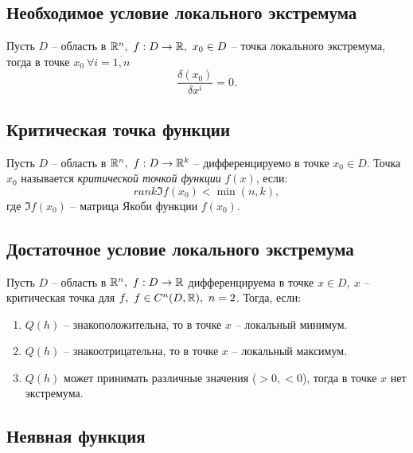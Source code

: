 \subsection{Необходимое условие локального экстремума}

\begin{theorem}
    Пусть $D$ -- область в $ \mathbb{R}^n, \ f:D \rightarrow\mathbb{R}, \ x_0 \in D $ -- точка локального экстремума, тогда в точке $ x_0 \ \forall i = \overline{1,n}$
    \[
        \frac{\delta(x_0)}{\delta x^i} = 0.
    \]
\end{theorem}

\subsection{Критическая точка функции}

\begin{definition}
    Пусть $ D $ -- область в $ \mathbb{R}^n, \ f:D \rightarrow\mathbb{R}^k $ -- дифференцируемо в точке $ x_0 \in D $. Точка $ x_0 $ называется \emph{критической точкой функции} $ f(x) $, если:
    \[
        rank \mathfrak{I} f(x_0) < \min(n,k),
    \] где $ \mathfrak{I}f(x_0) $ -- матрица Якоби функции $ f(x_0) $.
\end{definition}

\subsection{Достаточное условие локального экстремума}

\begin{theorem}
    Пусть $D$ -- область в $\mathbb{R}^n, \ f: D \rightarrow \mathbb{R}$ дифференцируема в точке $x \in D, \ x$ -- критическая точка для $f, \ f \in C^n(D,\mathbb{R}), \ n = 2$. Тогда, если:
    \begin{enumerate}
        \item $Q(h)$ -- знакоположительна, то в точке $x$ -- локальный минимум.
        \item $Q(h)$ -- знакоотрицательна, то в точке $x$ -- локальный максимум.
        \item $Q(h)$ может принимать различные значения ($>0, < 0$), тогда в точке $x$ нет экстремума.
    \end{enumerate}
\end{theorem}

\subsection{Неявная функция}


